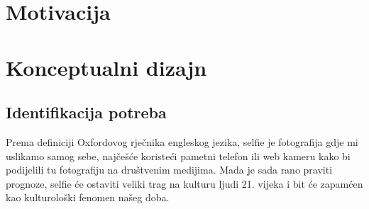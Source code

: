 \documentclass[12pt]{article}
\begin{document}






%





\section{Motivacija}
\section{Konceptualni dizajn}
\subsection{Identifikacija potreba}

Prema definiciji Oxfordovog rječnika engleskog jezika, selfie je fotografija gdje mi uslikamo samog sebe, najčešće koristeći pametni telefon ili web kameru kako bi podijelili tu fotografiju na društvenim medijima. Mada je sada rano praviti prognoze, selfie će ostaviti veliki trag na kulturu ljudi 21. vijeka i bit će zapamćen kao kulturološki fenomen našeg doba. 
\end{document}
